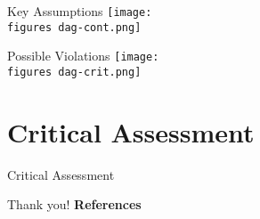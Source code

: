 \documentclass[10pt]{beamer}
\newcommand{\figures}{figures/}
\begin{document}
\begin{frame}{Key Assumptions}
  \centering
  \texttt{[image: \\figures dag-cont.png]}
\end{frame}

\begin{frame}{Possible Violations}
  \centering
  \texttt{[image: \\figures dag-crit.png]}
\end{frame}

\section{Critical Assessment}

\begin{frame}{Critical Assessment}

\end{frame}

\begin{frame}{Thank you!}
  \textbf{\large{References}}

  \cite{acemoglu_2001}
\end{frame}
\end{document}
